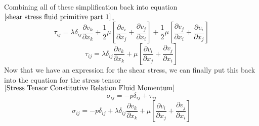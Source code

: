 Combining all of these simplification back into equation $\ref{shear stress fluid primitive part 1}$,
$$\tau_{ij} = \lambda \delta_{ij}\frac{\partial v_{k}}{\partial x_{k}} + \frac{1}{2}\mu\left[\frac{\partial v_{i}}{\partial x_{j}} + \frac{\partial v_{j}}{\partial x_{i}}\right] + \frac{1}{2}\mu\left[\frac{\partial v_{j}}{\partial x_{i}} + \frac{\partial v_{i}}{\partial x_{j}}\right]$$
$$\tau_{ij} = \lambda \delta_{ij}\frac{\partial v_{k}}{\partial x_{k}} + \mu\left[\frac{\partial v_{i}}{\partial x_{j}} + \frac{\partial v_{j}}{\partial x_{i}}\right]$$
Now that we have an expression for the shear stress, we can finally put this back into the equation for the stress tensor $\ref{Stress Tensor Constitutive Relation Fluid Momentum}$
$$\sigma_{ij} = -p\delta_{ij} + \tau_{ij}$$
$$\sigma_{ij} = -p\delta_{ij} + \lambda \delta_{ij}\frac{\partial v_{k}}{\partial x_{k}} + \mu\left[\frac{\partial v_{i}}{\partial x_{j}} + \frac{\partial v_{j}}{\partial x_{i}}\right]$$


